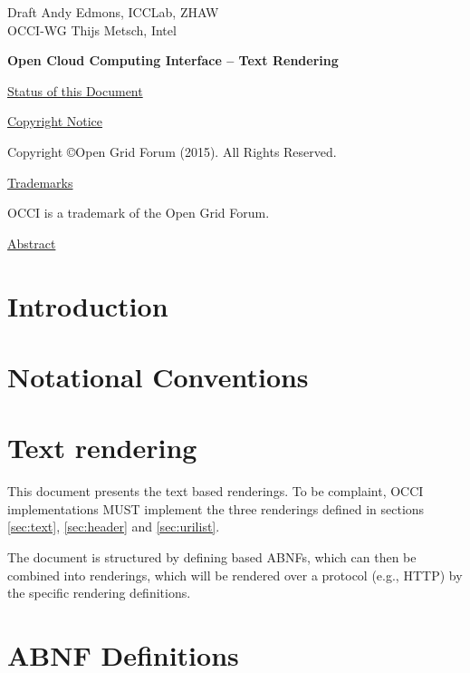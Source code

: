 \documentclass[10pt,a4paper]{article}
\begin{document}
\thispagestyle{empty}

Draft \hfill Andy Edmons, ICCLab, ZHAW \\
OCCI-WG \hfill Thijs Metsch, Intel\\
\rightline {\today}

\vspace*{0.5in}

\begin{Large}
\textbf{Open Cloud Computing Interface -- Text Rendering}
\end{Large}

\vspace*{0.5in}

\underline{Status of this Document}



\underline{Copyright Notice}

Copyright \copyright Open Grid Forum (2015). All Rights Reserved.

\underline{Trademarks}

OCCI is a trademark of the Open Grid Forum.

\underline{Abstract}



\newpage
\tableofcontents
\newpage

\section{Introduction}


\section{Notational Conventions}


\section{Text rendering}

This document presents the text based renderings. To be complaint, OCCI implementations MUST implement the three renderings defined in sections \ref{sec:text}, \ref{sec:header} and \ref{sec:urilist}.

The document is structured by defining based ABNFs, which can then be combined into renderings, which will be rendered over a protocol (e.g., HTTP) by the specific rendering definitions.

\section{ABNF Definitions}
\end{document}
